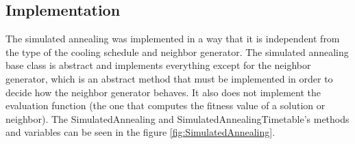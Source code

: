 \subsection{Implementation}

The simulated annealing was implemented in a way that it is independent from the type of the cooling schedule and neighbor generator. The simulated annealing base class is abstract and implements everything except for the neighbor generator, which is an abstract method that must be implemented in order to decide how the neighbor generator behaves. It also does not implement the evaluation function (the one that computes the fitness value of a solution or neighbor). The SimulatedAnnealing and SimulatedAnnealingTimetable's methods and variables can be seen in the figure \ref{fig:SimulatedAnnealing}.\\
\\
